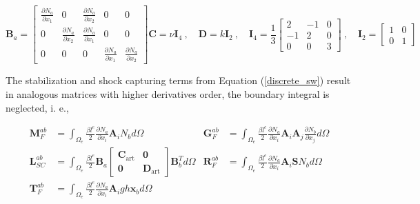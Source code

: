 \documentclass[a4paper,12pt]{article}
\newcommand{\pder}[2]{\frac{\partial#1}{\partial#2}}
\begin{document}
\begin{subequations}
\begin{equation}
\mathbf{B}_a = \left[\begin{matrix}
    \pder{N_a}{x_1} & 0 & \pder{N_a}{x_2} & 0 & 0 \\
    0 & \pder{N_a}{x_2} & \pder{N_a}{x_1} & 0 & 0 \\
    0 & 0 & 0 & \pder{N_a}{x_1} & \pder{N_a}{x_2}
\end{matrix}\right]
\end{equation}
\begin{equation}
\mathbf{C} = \nu \mathbf{I}_4 \ , \quad
\mathbf{D} = k \mathbf{I}_2 \ , \quad
\mathbf{I}_4 = \frac{1}{3} \left[\begin{matrix}
        2 & -1 & 0 \\
        -1 & 2 & 0 \\
        0 & 0 & 3
    \end{matrix}\right] \ , \quad
\mathbf{I}_2 = \left[\begin{matrix}
        1 & 0 \\
        0 & 1
    \end{matrix}\right]
\end{equation}
\end{subequations}

The stabilization and shock capturing terms from Equation (\ref{discrete_sw}) result in analogous matrices with higher derivatives order, the boundary integral is neglected, i. e.,

\begin{align}
\displaystyle\mathbf{M}_F^{ab} &= \int_{\Omega_e} \frac{\beta l^e}{2} \pder{N_a}{x_i}\mathbf{A}_i N_b d\Omega &
\displaystyle\mathbf{G}_F^{ab} &= \int_{\Omega_e} \frac{\beta l^e}{2} \pder{N_a}{x_i}\mathbf{A}_i\mathbf{A}_j \pder{N_b}{x_j} d\Omega \nonumber\\
\displaystyle\mathbf{L}_{SC}^{ab} &= \int_{\Omega_e} \frac{\beta l^e}{2} \mathbf{B}_a \left[\begin{matrix}
        \mathbf{C}_\text{art} & \mathbf{0} \\ \mathbf{0} & \mathbf{D}_\text{art}
    \end{matrix}\right] \mathbf{B}_b^T d\Omega &
\displaystyle\mathbf{R}_F^{ab} &= \int_{\Omega_e} \frac{\beta l^e}{2} \pder{N_a}{x_i}\mathbf{A}_i \mathbf{S} N_b d\Omega \\
\displaystyle\mathbf{T}_F^{ab} &= \int_{\Omega_e} \frac{\beta l^e}{2} \pder{N_a}{x_i}\mathbf{A}_i gh\mathbf{x}_b d\Omega
\nonumber
\end{align}
\end{document}
